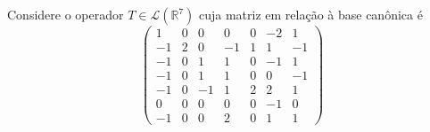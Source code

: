 \documentclass[11pt,a4paper]{article}
\begin{document}
\begin{exercicio}
Considere o operador $T \in \mathcal{L}(\mathbb{R}^7)$ cuja matriz em relação à base canônica é
\[
\begin{pmatrix}
1 &0 &0 &0 &0 &−2& 1 \\
−1& 2 &0 &−1 &1 &1& −1 \\
−1 &0 &1 &1 &0 &−1 &1 \\
−1 &0 &1 &1& 0 &0& −1 \\
−1 &0 &−1 &1 &2 &2& 1 \\
0 &0 &0 &0 &0 &−1& 0 \\
−1& 0& 0& 2& 0 &1 &1
\end{pmatrix}
\]
\end{exercicio}
\end{document}
